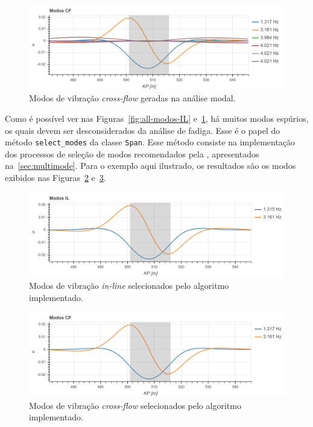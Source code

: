 \begin{figure}[H]
	\centering
	\caption{Modos de vibração \textit{cross-flow} geradas na análise modal.}\label{fig:all-modos-CF}
	\includegraphics[width=\textwidth]{imagens/exemplo/all_modos_CF}
\end{figure}

Como é possível ver nas Figuras~\ref{fig:all-modos-IL} e~\ref{fig:all-modos-CF}, há muitos modos espúrios, os quais devem ser desconsiderados da análise de fadiga. Esse é o papel do método \texttt{select\_modes} da classe \texttt{Span}. Esse método consiste na implementação dos processos de seleção de modos recomendados pela , apresentados na~\autoref{sec:multimode}. Para o exemplo aqui ilustrado, os resultados são os modos exibidos nas Figuras~\ref{fig:modos-IL} e~\ref{fig:modos-CF}.

\begin{figure}[!ht]
	\centering
	\caption{Modos de vibração \textit{in-line} selecionados pelo algoritmo implementado.}\label{fig:modos-IL}
	\includegraphics[width=\textwidth]{imagens/exemplo/modos_IL}
\end{figure}

\begin{figure}[!ht]
	\centering
	\caption{Modos de vibração \textit{cross-flow} selecionados pelo algoritmo implementado.}\label{fig:modos-CF}
	\includegraphics[width=\textwidth]{imagens/exemplo/modos_CF}
\end{figure}

